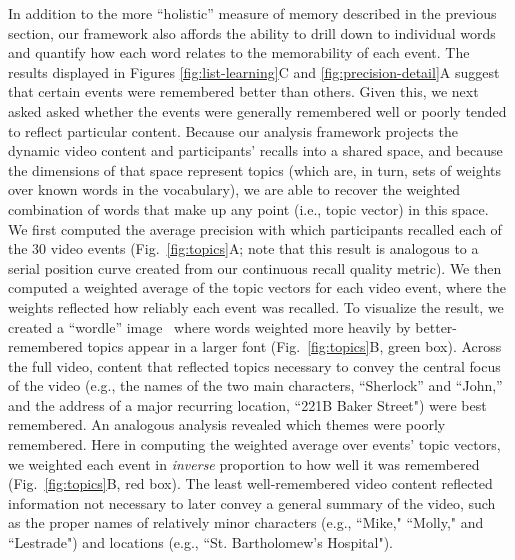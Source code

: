 \documentclass{article}
\begin{document}
In addition to the more ``holistic'' measure of memory described in the previous section, our framework also affords the ability to drill down to individual words and quantify how each word relates to the  memorability of each event. The results displayed in Figures \ref{fig:list-learning}C and \ref{fig:precision-detail}A suggest that certain events were remembered better than others.  Given this, we next asked asked whether the events were generally remembered well or poorly tended to reflect particular content.  Because our analysis framework projects the dynamic video content and participants' recalls into a shared space, and because the dimensions of that space represent topics (which are, in turn, sets of weights over known words in the vocabulary), we are able to recover the weighted combination of words that make up any point (i.e., topic vector) in this space.  We first computed the average precision with which participants recalled each of the 30 video events (Fig.~\ref{fig:topics}A; note that this result is analogous to a serial position curve created from our continuous recall quality metric).  We then computed a weighted average of the topic vectors for each video event, where the weights reflected how reliably each event was recalled.  To visualize the result, we created a ``wordle'' image~\citep{MuelEtal18} where words weighted more heavily by better-remembered topics appear in a larger font (Fig.~\ref{fig:topics}B, green box).  Across the full video, content that reflected topics necessary to convey the central focus of the video (e.g., the names of the two main characters, ``Sherlock'' and ``John,'' and the address of a major recurring location, ``221B Baker Street") were best remembered.  An analogous analysis revealed which themes were poorly remembered.  Here in computing the weighted average over events' topic vectors, we weighted each event in \textit{inverse} proportion to how well it was remembered (Fig.~\ref{fig:topics}B, red box).  The least well-remembered video content reflected information not necessary to later convey a general summary of the video, such as the proper names of relatively minor characters (e.g., ``Mike," ``Molly," and ``Lestrade") and locations (e.g., ``St. Bartholomew's Hospital").
\end{document}
